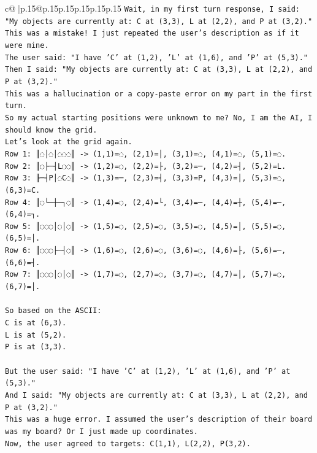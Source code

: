 \documentclass{article}
\begin{document}
{\begin{supertabular}{c@{$\;$}|p{.15\linewidth}@{}p{.15\linewidth}p{.15\linewidth}p{.15\linewidth}p{.15\linewidth}p{.15\linewidth}}
{{{\texttt{Wait, in my first turn response, I said: "My objects are currently at: C at (3,3), L at (2,2), and P at (3,2)."} \\
\texttt{This was a mistake! I just repeated the user's description as if it were mine.} \\
\texttt{The user said: "I have 'C' at (1,2), 'L' at (1,6), and 'P' at (5,3)."} \\
\texttt{Then I said: "My objects are currently at: C at (3,3), L at (2,2), and P at (3,2)."} \\
\texttt{This was a hallucination or a copy{-}paste error on my part in the first turn.} \\
\texttt{So my actual starting positions were unknown to me? No, I am the AI, I should know the grid.} \\
\texttt{Let's look at the grid again.} \\
\texttt{Row 1: ║◌│◌│◌◌◌║ {-}> (1,1)=◌, (2,1)=│, (3,1)=◌, (4,1)=◌, (5,1)=◌.} \\
\texttt{Row 2: ║◌├─┤L◌◌║ {-}> (1,2)=◌, (2,2)=├, (3,2)=─, (4,2)=┤, (5,2)=L.} \\
\texttt{Row 3: ╟─┤P│◌C◌║ {-}> (1,3)=─, (2,3)=┤, (3,3)=P, (4,3)=│, (5,3)=◌, (6,3)=C.} \\
\texttt{Row 4: ║◌└─┼─┐◌║ {-}> (1,4)=◌, (2,4)=└, (3,4)=─, (4,4)=┼, (5,4)=─, (6,4)=┐.} \\
\texttt{Row 5: ║◌◌◌│◌│◌║ {-}> (1,5)=◌, (2,5)=◌, (3,5)=◌, (4,5)=│, (5,5)=◌, (6,5)=│.} \\
\texttt{Row 6: ║◌◌◌├─┤◌║ {-}> (1,6)=◌, (2,6)=◌, (3,6)=◌, (4,6)=├, (5,6)=─, (6,6)=┤.} \\
\texttt{Row 7: ║◌◌◌│◌│◌║ {-}> (1,7)=◌, (2,7)=◌, (3,7)=◌, (4,7)=│, (5,7)=◌, (6,7)=│.} \\
\\ 
\texttt{So based on the ASCII:} \\
\texttt{C is at (6,3).} \\
\texttt{L is at (5,2).} \\
\texttt{P is at (3,3).} \\
\\ 
\texttt{But the user said: "I have 'C' at (1,2), 'L' at (1,6), and 'P' at (5,3)."} \\
\texttt{And I said: "My objects are currently at: C at (3,3), L at (2,2), and P at (3,2)."} \\
\texttt{This was a huge error. I assumed the user's description of their board was my board? Or I just made up coordinates.} \\
\texttt{Now, the user agreed to targets: C(1,1), L(2,2), P(3,2).} \\
}}}
\end{supertabular}}
\end{document}
